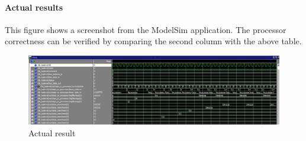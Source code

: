 \paragraph{Actual results}
This figure shows a screenshot from the ModelSim application. The processor correctness can be verified by comparing the second column with the above table.

\begin{figure}[h]
		\centerline{\includegraphics[width=550px]{figures/toplevel_tb_result}}
		\caption{Actual result}
\end{figure}

